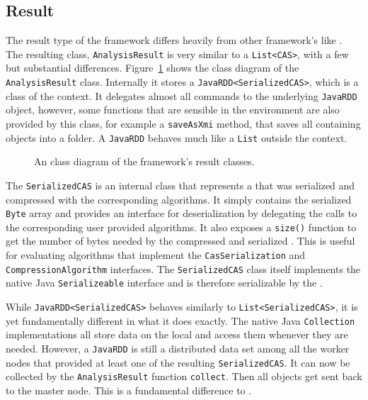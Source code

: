 \subsection{Result}
The result type of the framework differs heavily from other framework's like \uimaas{}. The resulting class, \lstinline|AnalysisResult| is very similar to a \lstinline|List<CAS>|, with a few but substantial differences. Figure~\ref{fig:sup_results} shows the \uml{} class diagram of the \lstinline|AnalysisResult| class. Internally it stores a \lstinline|JavaRDD<SerializedCAS>|, which is a class of the \spark{} context. It delegates almost all commands to the underlying \lstinline|JavaRDD| object, however, some functions that are sensible in the \uima{} environment are also provided by this class, for example a \lstinline|saveAsXmi| method, that saves all containing \cas{} objects into a folder. A \lstinline|JavaRDD| behaves much like a \lstinline|List| outside the \spark{} context.
\begin{figure}[!htb]
	\centering
	\resizebox{\linewidth}{!}{\footnotesize}
	\caption[An UML class diagram of the framework's result classes.]{An \uml{} class diagram of the framework's result classes.}
	\label{fig:sup_results}
\end{figure}
The \lstinline|SerializedCAS| is an internal class that represents a \cas{} that was serialized and compressed with the corresponding algorithms. It simply contains the serialized \lstinline|Byte| array and provides an interface for deserialization by delegating the calls to the corresponding user provided algorithms. It also exposes a \lstinline|size()| function to get the number of bytes needed by the compressed and serialized \cas{}. This is useful for evaluating algorithms that implement the \lstinline|CasSerialization| and \lstinline|CompressionAlgorithm| interfaces. The \lstinline|SerializedCAS| class itself implements the native Java \lstinline|Serializeable| interface and is therefore serializable by the \jvm{}.

While \lstinline|JavaRDD<SerializedCAS>| behaves similarly to \lstinline|List<SerializedCAS>|, it is yet fundamentally different in what it does exactly. The native Java \lstinline|Collection| implementations all store data on the local \jvm{} and access them whenever they are needed. However, a \lstinline|JavaRDD| is still a distributed data set among all the worker nodes that provided at least one of the resulting \lstinline|SerializedCAS|. It can now be collected by the \lstinline|AnalysisResult| function \lstinline|collect|. Then all \cas{} objects get sent back to the master node. This is a fundamental difference to \uimaas{}. 

